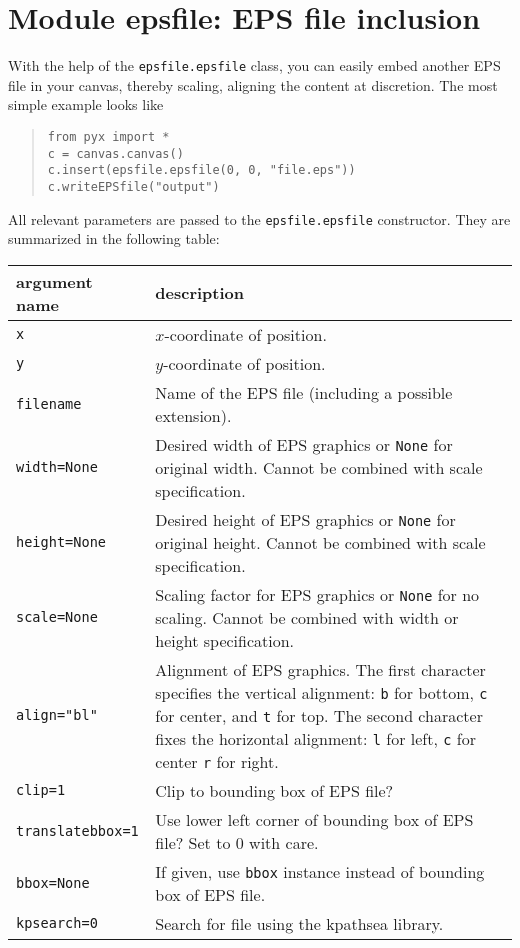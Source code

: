 \chapter{Module epsfile: EPS file inclusion}

With the help of the \verb|epsfile.epsfile| class, you can easily embed
another EPS file in your canvas, thereby scaling, aligning the content
at discretion. The most simple example looks like
\begin{quote}
\begin{verbatim}
from pyx import *
c = canvas.canvas()
c.insert(epsfile.epsfile(0, 0, "file.eps"))
c.writeEPSfile("output")
\end{verbatim}
\end{quote}

All relevant parameters are passed to the \verb|epsfile.epsfile|
constructor. They are summarized in the following table:

\medskip
\begin{tabularx}{\linewidth}{l>{\raggedright\arraybackslash}X}
argument name&description\\
\hline
\texttt{x} & $x$-coordinate of position.\\
\texttt{y} & $y$-coordinate of position.\\
\texttt{filename} & Name of the EPS file (including a possible
extension).\\
\texttt{width=None} & Desired width of EPS graphics or \texttt{None}
for original width. Cannot be combined with scale specification.\\
\texttt{height=None} & Desired height of EPS graphics or \texttt{None}
for original height. Cannot be combined with scale specification.\\
\texttt{scale=None} & Scaling factor for EPS graphics or \texttt{None}
for no scaling. Cannot be combined with width or height specification.\\
\texttt{align="bl"} & Alignment of EPS graphics. The first character
specifies the vertical alignment: \texttt{b} for bottom, \texttt{c}
for center, and \texttt{t} for top. The second character fixes the
horizontal alignment: \texttt{l} for left, \texttt{c} for center
\texttt{r} for right.\\
\texttt{clip=1} & Clip to bounding box of EPS file?\\
\texttt{translatebbox=1} & Use lower left corner of bounding box of EPS
file? Set to $0$ with care.\\
\texttt{bbox=None} & If given, use \texttt{bbox} instance instead of
bounding box of EPS file.\\
\texttt{kpsearch=0} & Search for file using the kpathsea library.
\end{tabularx}



\label{epsfile}


